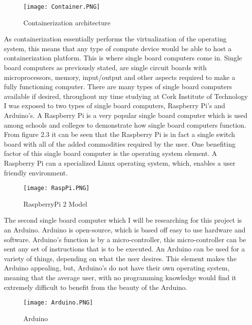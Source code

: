 \begin{figure}[ht]
  \centering
      \texttt{[image: Container.PNG]}
  \caption[Containerization architecture]{Containerization architecture}
  \label{fig:Containerization architecture}
\end{figure}



\pagebreak As containerization essentially performs the virtualization of the operating system, this means that any type of compute device would be able to host a containerization platform. This is where single board computers come in. Single board computers as previously stated, are single circuit boards with microprocessors, memory, input/output and other aspects required to make a fully functioning computer.\cite{Reference17} There are many types of single board computers available if desired, throughout my time studying at Cork Institute of Technology I was exposed to two types of single board computers, Raspberry Pi's and Arduino's. A Raspberry Pi is a very popular single board computer which is used among schools and colleges to demonstrate how single board computers function. From figure 2.3 it can be seen that the Raspberry Pi is in fact a single switch board with all of the added commodities required by the user. One benefiting factor of this single board computer is the operating system element. A Raspberry Pi can a specialized Linux operating system, which, enables a user friendly environment.         


\begin{figure}[ht]
  \centering
      \texttt{[image: RaspPi.PNG]}
  \caption[RaspberryPi 2 Model]{RaspberryPi 2 Model \cite{Reference18}}
  \label{fig:RaspberryPi}
\end{figure}

\pagebreak The second single board computer which I will be researching for this project is an Arduino. Arduino is open-source, which is based off easy to use hardware and software. Arduino's function is by a micro-controller, this micro-controller can be sent any set of instructions that is to be executed. An Arduino can be used for a variety of things, depending on what the user desires. This element makes the Arduino appealing, but, Arduino's do not have their own operating system, meaning that the average user, with no programming knowledge would find it extremely difficult to benefit from the beauty of the Arduino.

\begin{figure}[ht]
  \centering
      \texttt{[image: Arduino.PNG]}
  \caption[Arduino]{Arduino \cite{Reference19}}
  \label{fig:Arduino}
\end{figure}

